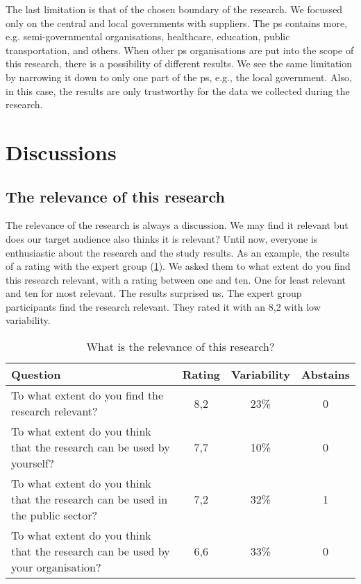 The last limitation is that of the chosen boundary of the research. We focussed only on the central and local governments with suppliers. The \gls{ps} contains more, e.g. semi-governmental organisations, healthcare, education, public transportation, and others. When other \gls{ps} organisations are put into the scope of this research, there is a possibility of different results. We see the same limitation by narrowing it down to only one part of the \gls{ps}, e.g., the local government. Also, in this case, the results are only trustworthy for the data we collected during the research.

\section{Discussions}
\label{sec:discussions}

\subsection{The relevance of this research}
\label{sub:relevanceofresearch}
The relevance of the research is always a discussion. We may find it relevant but does our target audience also thinks it is relevant? Until now, everyone is enthusiastic about the research and the study results. As an example, the results of a rating with the expert group (\cref{tab:relevance}). We asked them to what extent do you find this research relevant, with a rating between one and ten. One for least relevant and ten for most relevant. The results surprised us. The expert group participants find the research relevant. They rated it with an 8,2 with low variability.
\begin{table}[H]
	\centering
	\begin{tabular}{p{}ccc}
		\toprule
		\textbf{Question} & \textbf{Rating} & \textbf{Variability} & \textbf{Abstains} \\
		\midrule
		To what extent do you find the research relevant? & 8,2 & 23\% & 0 \\%
		To what extent do you think that the research can be used by yourself? & 7,7 & 10\% & 0 \\%
		To what extent do you think that the research can be used in the public sector? & 7,2 & 32\% & 1 \\%
		To what extent do you think that the research can be used by your organisation? & 6,6 & 33\% & 0 \\%
		\bottomrule
	\end{tabular}%
	\caption[What is the relevance of this research?]{What is the relevance of this research?}
	\label{tab:relevance}%
\end{table}%

